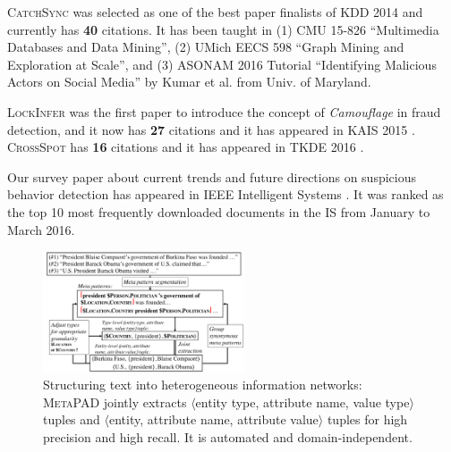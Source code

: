 \documentclass[10.5pt]{article}
\newcommand{\lb}{\mbox{$\langle$}}
\newcommand{\rb}{\mbox{$\rangle$}}
\newcommand{\tuple}[3]{{\lb#1, #2, #3\rb}\xspace}
\begin{document}
\begin{compactitem}
\item \textsc{CatchSync} \cite{jiang2014catchsync} was selected as one of the best paper finalists of KDD 2014 and currently has \textbf{40} citations. It has been taught in (1) CMU 15-826 ``Multimedia Databases and Data Mining'', (2) UMich EECS 598 ``Graph Mining and Exploration at Scale'', and (3) ASONAM 2016 Tutorial ``Identifying Malicious Actors on Social Media'' by Kumar et al. from Univ. of Maryland.
\item \textsc{LockInfer} \cite{jiang2014inferring} was the first paper to introduce the concept of \textit{Camouflage} in fraud detection, and it now has \textbf{27} citations and it has appeared in KAIS 2015 \cite{jiang2015inferring}. \textsc{CrossSpot} \cite{jiang2015general} has \textbf{16} citations and it has appeared in TKDE 2016 \cite{jiang2016spotting}. %
\item Our survey paper about current trends and future directions on suspicious behavior detection has appeared in IEEE Intelligent Systems \cite{jiang2016suspicious}. It was ranked as the top 10 most frequently downloaded documents in the IS from January to March 2016.
\end{compactitem}

\vskip 0.03in
\vskip 0.01in


\begin{figure}
\vskip -0.18in
\includegraphics[width=0.53\textwidth]{figure/metapad.pdf}
\vskip -0.18in
\caption{Structuring text into heterogeneous information networks: \textsc{MetaPAD} jointly extracts \tuple{entity type}{attribute name}{value type} tuples and \tuple{entity}{attribute name}{attribute value} tuples for high precision and high recall. It is automated and domain-independent.}
\label{fig:metapad}
\vskip -0.12in
\end{figure}
\end{document}

